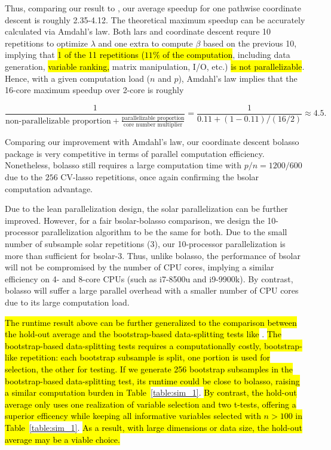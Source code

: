 \documentclass[12pt]{article}
\begin{document}
Thus, comparing our result to \citet{friedman2010regularization}, our average speedup for one pathwise coordinate descent is roughly 2.35-4.12. The theoretical maximum speedup can be accurately calculated via Amdahl's law. Both lars and coordinate descent requre 10 repetitions to optimize $\lambda$ and one extra to compute $\beta$ based on the previous 10, implying that \hl{1 of the 11 repetitions ($11\%$ of the computation}, including data generation, \hl{variable ranking,} matrix manipulation, I/O, etc.) \hl{is not parallelizable}. Hence, with a given computation load ($n$ and $p$), Amdahl's law implies that the 16-core maximum speedup over 2-core is roughly

\begin{equation}
  \frac{1}{\mbox{non-parallelizable proportion} + \frac{\mbox{parallelizable proportion}}{\mbox{core number multiplier}}} = \frac{1}{0.11 + (1-0.11)/(16/2)} \approx 4.5.
\end{equation}

\noindent
Comparing our improvement with Amdahl's law, our coordinate descent bolasso package is very competitive in terms of parallel computation efficiency. Nonetheless, bolasso still requires a large computation time with $p/n=1200/600$ due to the $256$ CV-lasso repetitions, once again confirming the bsolar computation advantage.

Due to the lean parallelization design, the solar parallelization can be further improved. However, for a fair bsolar-bolasso comparison, we design the 10-processor parallelization algorithm to be the same for both. Due to the small number of subsample solar repetitions (3), our 10-processor parallelization is more than sufficient for bsolar-3. Thus, unlike bolasso, the performance of bsolar will not be compromised by the number of CPU cores, implying a similar efficiency on 4- and 8-core CPUs (such as i7-8500u and i9-9900k). By contrast, bolasso will suffer a large parallel overhead with a smaller number of CPU cores due to its large computation load.

\hl{The runtime result above can be further generalized to the comparison between the hold-out average and the bootstrap-based data-splitting tests like} \citet{meinshausen2009p}. \hl{The bootstrap-based data-splitting tests requires a computationally costly, bootstrap-like repetition: each bootstrap subsample is split, one portion is used for selection, the other for testing. If we generate 256 bootstrap subsamples in the bootstrap-based data-splitting test, its runtime could be close to bolasso, raising a similar computation burden in Table~}\ref{table:sim_1}. \hl{By contrast, the hold-out average only uses one realization of variable selection and two t-tests, offering a superior efficency while keeping all informative variables selected with $n>100$ in Table~}\ref{table:sim_1}. \hl{As a result, with large dimensions or data size, the hold-out average may be a viable choice.}
\end{document}
